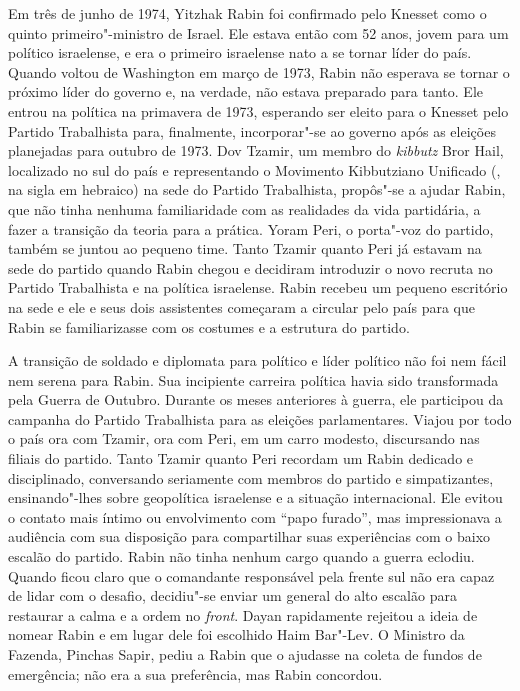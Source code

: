 Em três de junho de 1974, Yitzhak Rabin foi confirmado pelo Knesset como
o quinto primeiro"-ministro de Israel. Ele estava então com 52
anos, jovem para um político israelense, e era o primeiro israelense
nato a se tornar líder do país. Quando voltou de Washington em março de
1973, Rabin não esperava se tornar o próximo líder do governo e, na
verdade, não estava preparado para tanto. Ele entrou na política na
primavera de 1973, esperando ser eleito para o Knesset pelo Partido
Trabalhista para, finalmente, incorporar"-se ao governo após as eleições
planejadas para outubro de 1973. Dov Tzamir, um membro do \emph{kibbutz} Bror
Hail, localizado no sul do país e representando o Movimento Kibbutziano Unificado
(, na sigla em hebraico) na sede do Partido
Trabalhista, propôs"-se a ajudar Rabin, que não tinha nenhuma
familiaridade com as realidades da vida partidária, a fazer a transição
da teoria para a prática. Yoram Peri, o porta"-voz do partido, também se
juntou ao pequeno time. Tanto Tzamir quanto Peri já estavam na sede do
partido quando Rabin chegou e decidiram introduzir o novo recruta no
Partido Trabalhista e na política israelense. Rabin recebeu um pequeno
escritório na sede e ele e seus dois assistentes começaram a circular
pelo país para que Rabin se familiarizasse com os costumes e a estrutura
do partido.

A transição de soldado e diplomata para político e líder
político não foi nem fácil nem serena para Rabin. Sua incipiente carreira política
havia sido transformada pela Guerra de Outubro. Durante os meses
anteriores à guerra, ele participou da campanha do Partido Trabalhista
para as eleições parlamentares. Viajou por todo o país ora com Tzamir, ora com
Peri, em um carro modesto, discursando nas filiais do partido. Tanto
Tzamir quanto Peri recordam um Rabin dedicado e disciplinado,
conversando seriamente com membros do partido e simpatizantes,
ensinando"-lhes sobre geopolítica israelense e a situação internacional.
Ele evitou o contato mais íntimo ou envolvimento com ``papo furado'', mas
impressionava a audiência com sua disposição para compartilhar suas
experiências com o baixo escalão do partido. Rabin não tinha nenhum
cargo quando a guerra eclodiu. Quando ficou claro que o comandante
responsável pela frente sul não era capaz de lidar com o desafio,
decidiu"-se enviar um general do alto escalão para restaurar a calma e a
ordem no \emph{front}. Dayan rapidamente rejeitou a ideia de nomear Rabin e em
lugar dele foi escolhido Haim Bar"-Lev. O Ministro da Fazenda, Pinchas
Sapir, pediu a Rabin que o ajudasse na coleta de fundos de emergência;
não era a sua preferência, mas Rabin concordou.

